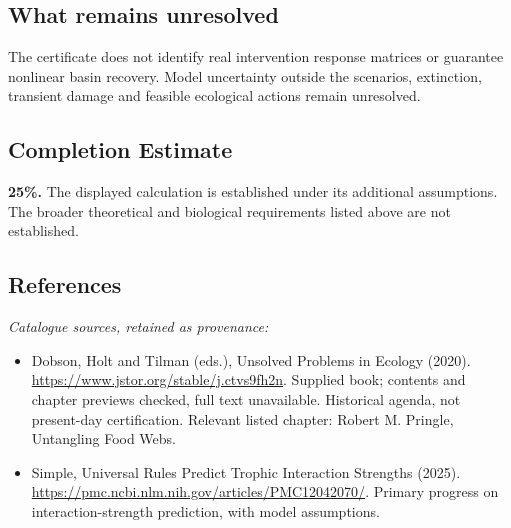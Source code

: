 \documentclass[11pt]{article}
\begin{document}
\subsection{What remains unresolved}
The certificate does not identify real intervention response matrices or guarantee nonlinear basin recovery. Model uncertainty outside the scenarios, extinction, transient damage and feasible ecological actions remain unresolved.
\subsection{Completion Estimate}
\textbf{25\%.} The displayed calculation is established under its additional assumptions. The broader theoretical and biological requirements listed above are not established.
\subsection{References}
\noindent\emph{Catalogue sources, retained as provenance:}
\begin{itemize}
\item Dobson, Holt and Tilman (eds.), Unsolved Problems in Ecology (2020). \url{https://www.jstor.org/stable/j.ctvs9fh2n}. Supplied book; contents and chapter previews checked, full text unavailable. Historical agenda, not present-day certification. Relevant listed chapter: Robert M. Pringle, Untangling Food Webs.
\item Simple, Universal Rules Predict Trophic Interaction Strengths (2025). \url{https://pmc.ncbi.nlm.nih.gov/articles/PMC12042070/}. Primary progress on interaction-strength prediction, with model assumptions.
\end{itemize}
\clearpage


\appendix
\end{document}
